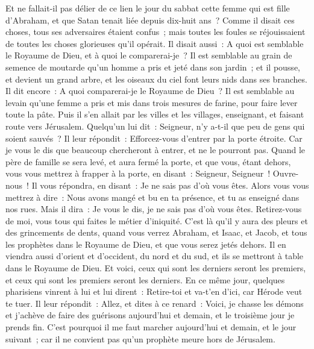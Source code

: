 \begin{multicols}{2}
Et ne fallait-il pas délier de ce lien le jour du sabbat cette femme qui est fille d'Abraham, et que Satan tenait liée depuis dix-huit ans~?
Comme il disait ces choses, tous ses adversaires étaient confus~; mais toutes les foules se réjouissaient de toutes les choses glorieuses qu'il opérait.
Il disait aussi~: A quoi est semblable le Royaume de Dieu, et à quoi le comparerai-je~?
Il est semblable au grain de semence de moutarde qu'un homme a pris et jeté dans son jardin~; et il pousse, et devient un grand arbre, et les oiseaux du ciel font leurs nids dans ses branches.
Il dit encore~: A quoi comparerai-je le Royaume de Dieu~?
Il est semblable au levain qu'une femme a pris et mis dans trois mesures de farine, pour faire lever toute la pâte.
Puis il s'en allait par les villes et les villages, enseignant, et faisant route vers Jérusalem.
Quelqu'un lui dit~: Seigneur, n'y a-t-il que peu de gens qui soient sauvés~? Il leur répondit~:
Efforcez-vous d'entrer par la porte étroite. Car je vous le dis que beaucoup chercheront à entrer, et ne le pourront pas.
Quand le père de famille se sera levé, et aura fermé la porte, et que vous, étant dehors, vous vous mettrez à frapper à la porte, en disant~: Seigneur, Seigneur~! Ouvre-nous~! Il vous répondra, en disant~: Je ne sais pas d'où vous êtes.
Alors vous vous mettrez à dire~: Nous avons mangé et bu en ta présence, et tu as enseigné dans nos rues.
Mais il dira~: Je vous le dis, je ne sais pas d'où vous êtes. Retirez-vous de moi, vous tous qui faites le métier d'iniquité.
C'est là qu'il y aura des pleurs et des grincements de dents, quand vous verrez Abraham, et Isaac, et Jacob, et tous les prophètes dans le Royaume de Dieu, et que vous serez jetés dehors.
Il en viendra aussi d'orient et d'occident, du nord et du sud, et ils se mettront à table dans le Royaume de Dieu.
Et voici, ceux qui sont les derniers seront les premiers, et ceux qui sont les premiers seront les derniers.
En ce même jour, quelques pharisiens vinrent à lui et lui dirent~: Retire-toi et va-t'en d'ici, car Hérode veut te tuer.
Il leur répondit~: Allez, et dites à ce renard~: Voici, je chasse les démons et j'achève de faire des guérisons aujourd'hui et demain, et le troisième jour je prends fin.
C'est pourquoi il me faut marcher aujourd'hui et demain, et le jour suivant~; car il ne convient pas qu'un prophète meure hors de Jérusalem.

\end{multicols}
